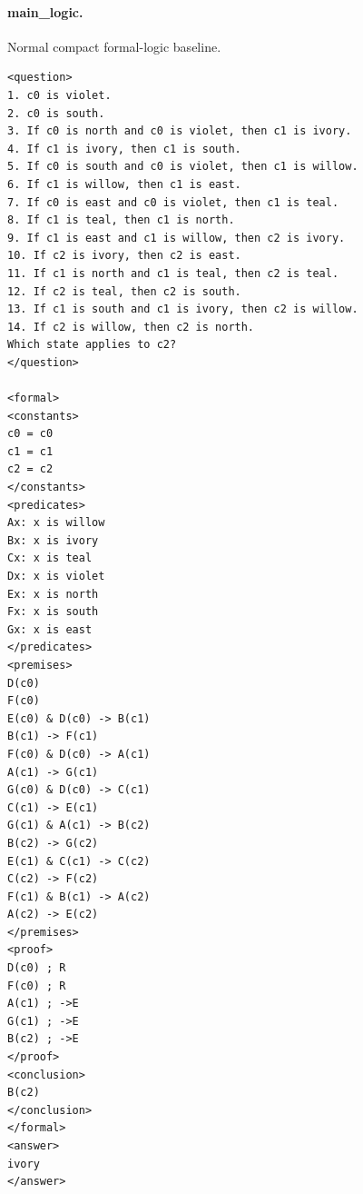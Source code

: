 \documentclass[10pt]{article}
\begin{document}
\paragraph{main\_logic.} Normal compact formal-logic baseline.
\begin{verbatim}
<question>
1. c0 is violet.
2. c0 is south.
3. If c0 is north and c0 is violet, then c1 is ivory.
4. If c1 is ivory, then c1 is south.
5. If c0 is south and c0 is violet, then c1 is willow.
6. If c1 is willow, then c1 is east.
7. If c0 is east and c0 is violet, then c1 is teal.
8. If c1 is teal, then c1 is north.
9. If c1 is east and c1 is willow, then c2 is ivory.
10. If c2 is ivory, then c2 is east.
11. If c1 is north and c1 is teal, then c2 is teal.
12. If c2 is teal, then c2 is south.
13. If c1 is south and c1 is ivory, then c2 is willow.
14. If c2 is willow, then c2 is north.
Which state applies to c2?
</question>

<formal>
<constants>
c0 = c0
c1 = c1
c2 = c2
</constants>
<predicates>
Ax: x is willow
Bx: x is ivory
Cx: x is teal
Dx: x is violet
Ex: x is north
Fx: x is south
Gx: x is east
</predicates>
<premises>
D(c0)
F(c0)
E(c0) & D(c0) -> B(c1)
B(c1) -> F(c1)
F(c0) & D(c0) -> A(c1)
A(c1) -> G(c1)
G(c0) & D(c0) -> C(c1)
C(c1) -> E(c1)
G(c1) & A(c1) -> B(c2)
B(c2) -> G(c2)
E(c1) & C(c1) -> C(c2)
C(c2) -> F(c2)
F(c1) & B(c1) -> A(c2)
A(c2) -> E(c2)
</premises>
<proof>
D(c0) ; R
F(c0) ; R
A(c1) ; ->E
G(c1) ; ->E
B(c2) ; ->E
</proof>
<conclusion>
B(c2)
</conclusion>
</formal>
<answer>
ivory
</answer>
\end{verbatim}
\end{document}
